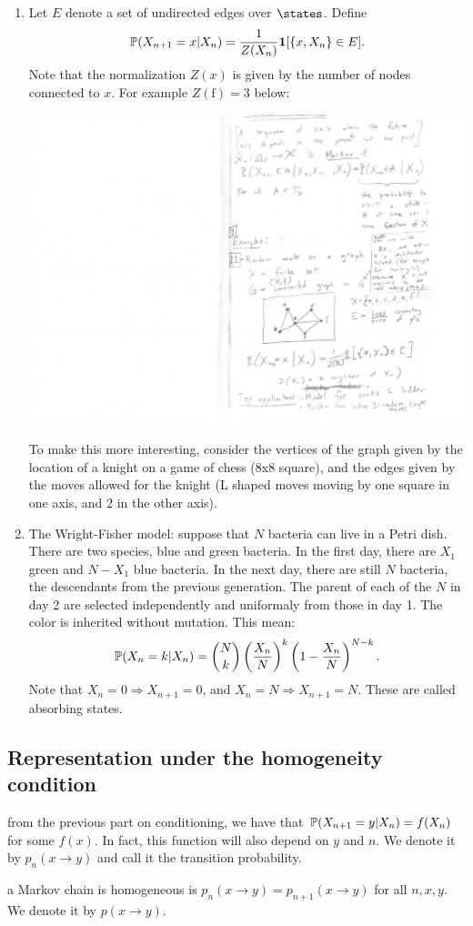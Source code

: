 \documentclass{article}
\begin{document}
\begin{enumerate}
  \item Let $E$ denote a set of undirected edges over $\states$. Define \[ \P(X_{n+1} = x | X_n) = \frac{1}{Z(X_n)} \1[\{x, X_n\} \in E]. \]Note that the normalization $Z(x)$ is given by the number of nodes connected to $x$. For example $Z(\text{f}) = 3$ below: 
  \begin{center}
  	\includegraphics[width=0.3\linewidth]{figures/discrete-graph} 
  \end{center}
  To make this more interesting, consider the vertices of the graph given by the location of a knight on a game of chess (8x8 square), and the edges given by the moves allowed for the knight (L shaped moves moving by one square in one axis, and 2 in the other axis). 
  \item The Wright-Fisher model: suppose that $N$ bacteria can live in a Petri dish. There are two species, blue and green bacteria. In the first day, there are $X_1$ green and $N-X_1$ blue bacteria. In the next day, there are still $N$ bacteria, the descendants from the previous generation. The parent of each of the $N$ in day 2 are selected independently and uniformaly from those in day 1. The color is inherited without mutation. This mean: \[ \P(X_n = k | X_n) = \binom{N}{k} \left(\frac{X_n}{N}\right)^k \left( 1 - \frac{X_n}{N}\right)^{N-k}. \]Note that $X_n = 0 \Rightarrow X_{n+1} = 0$, and $X_n = N \Rightarrow X_{n+1} = N$. These are called absorbing states.  
\end{enumerate}


\subsection{Representation under the homogeneity condition}

 from the previous part on conditioning, we have that $\P(X_{n+1} = y | X_n) = f(X_n)$ for some $f(x)$. In fact, this function will also depend on $y$ and $n$. We denote it by $p_n(x \to y)$ and call it the transition probability.

 a Markov chain is homogeneous is $p_n(x \to y) = p_{n+1}(x \to y)$ for all $n, x, y$. We denote it by $p(x \to y)$. 
\end{document}
